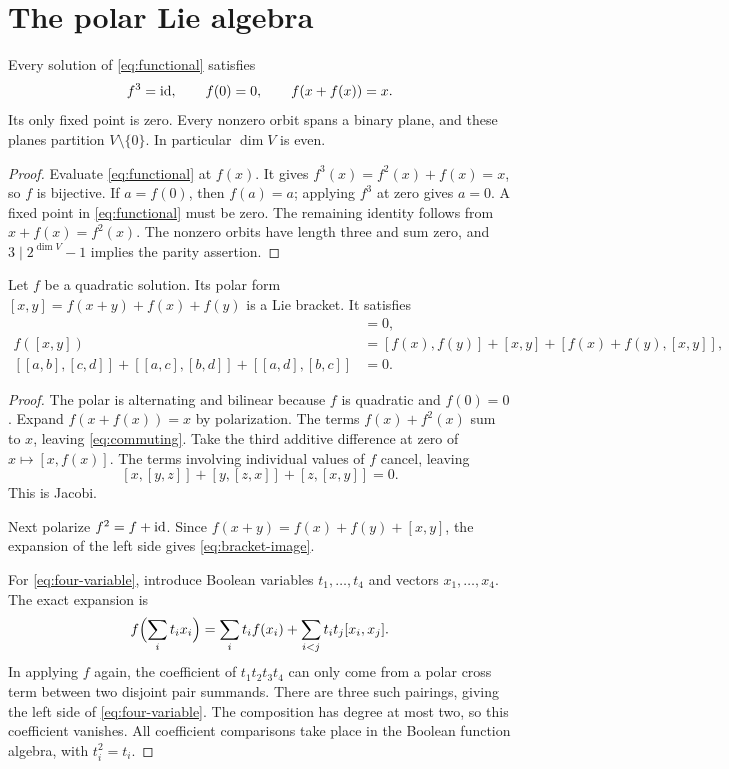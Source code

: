\section{The polar Lie algebra}
\label{sec:polar}

\begin{proposition}\label{prop:cycles}
Every solution of \eqref{eq:functional} satisfies
\[
 f^3=\operatorname{id},\qquad f(0)=0,\qquad
 f(x+f(x))=x.
\]
Its only fixed point is zero. Every nonzero orbit spans a binary plane,
and these planes partition \(V\setminus\{0\}\). In particular \(\dim V\)
is even.
\end{proposition}
\begin{proof}
Evaluate \eqref{eq:functional} at \(f(x)\). It gives
\(f^3(x)=f^2(x)+f(x)=x\), so \(f\) is bijective.
If \(a=f(0)\), then \(f(a)=a\); applying \(f^3\) at zero gives \(a=0\).
A fixed point in \eqref{eq:functional} must be zero.
The remaining identity follows from
\(x+f(x)=f^2(x)\). The nonzero orbits have length three and sum zero,
and \(3\mid 2^{\dim V}-1\) implies the parity assertion.
\end{proof}

\begin{theorem}\label{thm:polar}
Let \(f\) be a quadratic solution. Its polar form
\([x,y]=f(x+y)+f(x)+f(y)\) is a Lie bracket. It satisfies
\begin{align}
 [x,f(x)]&=0,\label{eq:commuting}\\
 f([x,y])&=[f(x),f(y)]+[x,y]
                  +[f(x)+f(y),[x,y]],\label{eq:bracket-image}\\
 [[a,b],[c,d]]+[[a,c],[b,d]]+[[a,d],[b,c]]&=0.
 \label{eq:four-variable}
\end{align}
\end{theorem}
\begin{proof}
The polar is alternating and bilinear because \(f\) is quadratic and
\(f(0)=0\). Expand \(f(x+f(x))=x\) by polarization. The terms
\(f(x)+f^2(x)\) sum to \(x\), leaving \eqref{eq:commuting}.
Take the third additive difference at zero of \(x\mapsto[x,f(x)]\).
The terms involving individual values of \(f\) cancel, leaving
\[
 [x,[y,z]]+[y,[z,x]]+[z,[x,y]]=0.
\]
This is Jacobi.

Next polarize \(f^2=f+\operatorname{id}\). Since
\(f(x+y)=f(x)+f(y)+[x,y]\), the expansion of the left side gives
\eqref{eq:bracket-image}.

For \eqref{eq:four-variable}, introduce Boolean variables
\(t_1,\ldots,t_4\) and vectors \(x_1,\ldots,x_4\). The exact expansion is
\[
 f\Bigl(\sum_i t_ix_i\Bigr)
   =\sum_i t_if(x_i)+\sum_{i<j}t_it_j[x_i,x_j].
\]
In applying \(f\) again, the coefficient of \(t_1t_2t_3t_4\) can only
come from a polar cross term between two disjoint pair summands.
There are three such pairings, giving the left side of
\eqref{eq:four-variable}. The composition has degree at most two,
so this coefficient vanishes. All coefficient comparisons take place in
the Boolean function algebra, with \(t_i^2=t_i\).
\end{proof}

